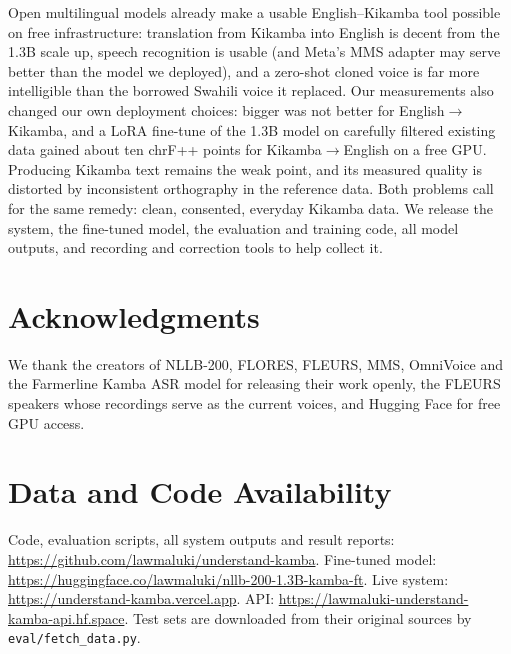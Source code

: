 \documentclass[11pt]{article}
\begin{document}
Open multilingual models already make a usable English--Kikamba tool possible on free infrastructure: translation from Kikamba into English is decent from the 1.3B scale up, speech recognition is usable (and Meta's MMS adapter may serve better than the model we deployed), and a zero-shot cloned voice is far more intelligible than the borrowed Swahili voice it replaced. Our measurements also changed our own deployment choices: bigger was not better for English$\rightarrow$Kikamba, and a LoRA fine-tune of the 1.3B model on carefully filtered existing data gained about ten chrF++ points for Kikamba$\rightarrow$English on a free GPU. Producing Kikamba text remains the weak point, and its measured quality is distorted by inconsistent orthography in the reference data. Both problems call for the same remedy: clean, consented, everyday Kikamba data. We release the system, the fine-tuned model, the evaluation and training code, all model outputs, and recording and correction tools to help collect it.

\section*{Acknowledgments}
We thank the creators of NLLB-200, FLORES, FLEURS, MMS, OmniVoice and the Farmerline Kamba ASR model for releasing their work openly, the FLEURS speakers whose recordings serve as the current voices, and Hugging Face for free GPU access.

\section*{Data and Code Availability}
Code, evaluation scripts, all system outputs and result reports: \url{https://github.com/lawmaluki/understand-kamba}. Fine-tuned model: \url{https://huggingface.co/lawmaluki/nllb-200-1.3B-kamba-ft}. Live system: \url{https://understand-kamba.vercel.app}. API: \url{https://lawmaluki-understand-kamba-api.hf.space}. Test sets are downloaded from their original sources by \texttt{eval/fetch\_data.py}.



\appendix

\end{document}
